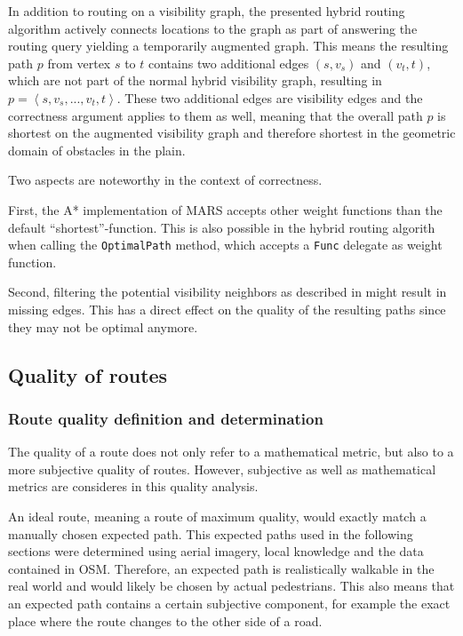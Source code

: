 		In addition to routing on a visibility graph, the presented hybrid routing algorithm actively connects locations to the graph as part of answering the routing query yielding a temporarily augmented graph.
		This means the resulting path $p$ from vertex $s$ to $t$ contains two additional edges $(s, v_s)$ and $(v_t, t)$, which are not part of the normal hybrid visibility graph, resulting in $p=\left\langle s, v_s, ..., v_t, t \right\rangle$.
		These two additional edges are visibility edges and the correctness argument applies to them as well, meaning that the overall path $p$ is shortest on the augmented visibility graph and therefore shortest in the geometric domain of obstacles in the plain.
		
		Two aspects are noteworthy in the context of correctness.
		
		First, the A* implementation of MARS accepts other weight functions than the default \enquote{shortest}-function.
		This is also possible in the hybrid routing algorith when calling the \texttt{OptimalPath} method, which accepts a \texttt{Func} delegate as weight function.
		
		Second, filtering the potential visibility neighbors as described in  might result in missing edges.
		This has a direct effect on the quality of the resulting paths since they may not be optimal anymore.
		
	\subsection{Quality of routes}
	
		\subsubsection{Route quality definition and determination}
	
			The quality of a route does not only refer to a mathematical metric, but also to a more subjective quality of routes.
			However, subjective as well as mathematical metrics are consideres in this quality analysis.
			
			An ideal route, meaning a route of maximum quality, would exactly match a manually chosen expected path.
			This expected paths used in the following sections were determined using aerial imagery, local knowledge and the data contained in OSM.
			Therefore, an expected path is realistically walkable in the real world and would likely be chosen by actual pedestrians.
			This also means that an expected path contains a certain subjective component, for example the exact place where the route changes to the other side of a road.
	
